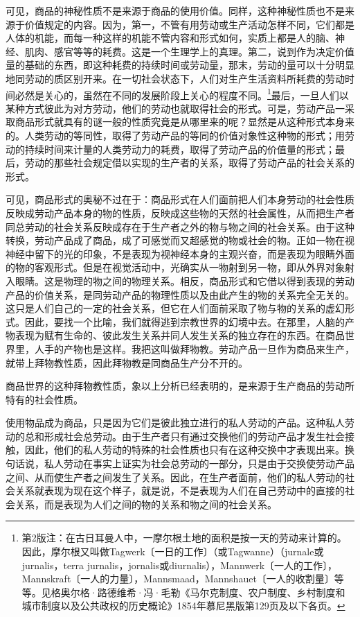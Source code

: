 \documentclass{ctexbook}
\begin{document}
    可见，商品的神秘性质不是来源于商品的使用价值。同样，这种神秘性质也不是来源于价值规定的内容。因为，第一，不管有用劳动或生产活动怎样不同，它们都是人体的机能，而每一种这样的机能不管内容和形式如何，实质上都是人的脑、神经、肌肉、感官等等的耗费。这是一个生理学上的真理。第二，说到作为决定价值量的基础的东西，即这种耗费的持续时间或劳动量，那末，劳动的量可以十分明显地同劳动的质区别开来。在一切社会状态下，人们对生产生活资料所耗费的劳动时间必然是关心的，虽然在不同的发展阶段上关心的程度不同。\footnote{第2版注：在古日耳曼人中，一摩尔根土地的面积是按一天的劳动来计算的。因此，摩尔根又叫做Tagwerk〔一日的工作〕（或Tagwanne）（jurnale或jurnalis，terra jurnalis，jornalis或diurnalis），Mannwerk〔一人的工作〕，Mannskraft〔一人的力量〕，Mannsmaad，Mannshauet〔一人的收割量〕等等。见格奥尔格·路德维希·冯·毛勒《马尔克制度、农户制度、乡村制度和城市制度以及公共政权的历史概论》1854年慕尼黑版第129页及以下各页。}最后，一旦人们以某种方式彼此为对方劳动，他们的劳动也就取得社会的形式。可是，劳动产品一采取商品形式就具有的谜一般的性质究竟是从哪里来的呢？显然是从这种形式本身来的。人类劳动的等同性，取得了劳动产品的等同的价值对象性这种物的形式；用劳动的持续时间来计量的人类劳动力的耗费，取得了劳动产品的价值量的形式；最后，劳动的那些社会规定借以实现的生产者的关系，取得了劳动产品的社会关系的形式。
    
    可见，商品形式的奥秘不过在于：商品形式在人们面前把人们本身劳动的社会性质反映成劳动产品本身的物的性质，反映成这些物的天然的社会属性，从而把生产者同总劳动的社会关系反映成存在于生产者之外的物与物之间的社会关系。由于这种转换，劳动产品成了商品，成了可感觉而又超感觉的物或社会的物。正如一物在视神经中留下的光的印象，不是表现为视神经本身的主观兴奋，而是表现为眼睛外面的物的客观形式。但是在视觉活动中，光确实从一物射到另一物，即从外界对象射入眼睛。这是物理的物之间的物理关系。相反，商品形式和它借以得到表现的劳动产品的价值关系，是同劳动产品的物理性质以及由此产生的物的关系完全无关的。这只是人们自己的一定的社会关系，但它在人们面前采取了物与物的关系的虚幻形式。因此，要找一个比喻，我们就得逃到宗教世界的幻境中去。在那里，人脑的产物表现为赋有生命的、彼此发生关系并同人发生关系的独立存在的东西。在商品世界里，人手的产物也是这样。我把这叫做拜物教。劳动产品一旦作为商品来生产，就带上拜物教性质，因此拜物教是同商品生产分不开的。
    
    商品世界的这种拜物教性质，象以上分析已经表明的，是来源于生产商品的劳动所特有的社会性质。
    
    使用物品成为商品，只是因为它们是彼此独立进行的私人劳动的产品。这种私人劳动的总和形成社会总劳动。由于生产者只有通过交换他们的劳动产品才发生社会接触，因此，他们的私人劳动的特殊的社会性质也只有在这种交换中才表现出来。换句话说，私人劳动在事实上证实为社会总劳动的一部分，只是由于交换使劳动产品之间、从而使生产者之间发生了关系。因此，在生产者面前，他们的私人劳动的社会关系就表现为现在这个样子，就是说，不是表现为人们在自己劳动中的直接的社会关系，而是表现为人们之间的物的关系和物之间的社会关系。
    
\end{document}
